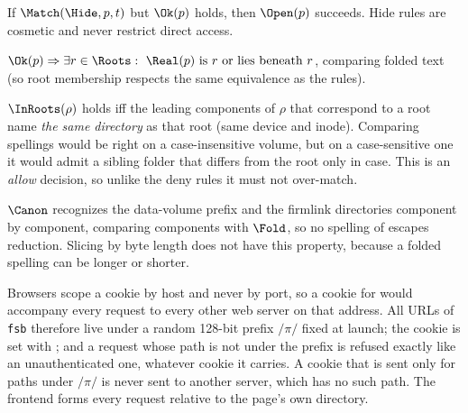 \begin{law}
\label{law:hidden-reachable}
If $\Match(\Hide,p,t)$ but $\Ok(p)$ holds, then $\Open(p)$ succeeds.  Hide rules
are cosmetic and never restrict direct access.
\end{law}

\begin{law}[Containment]
\label{law:containment}
$\Ok(p)\Rightarrow\exists r\in\Roots:\ \Real(p)\text{ is }r\text{ or lies beneath }r$,
comparing folded text (so root membership respects the same equivalence as the
rules).
\end{law}

\begin{law}
\label{law:root-identity}
$\InRoots(\rho)$ holds iff the leading components of $\rho$ that correspond to a
root name \emph{the same directory} as that root (same device and inode).
Comparing spellings would be right on a case-insensitive volume, but on a
case-sensitive one it would admit a sibling folder that differs from the root
only in case.  This is an \emph{allow} decision, so unlike the deny rules it must
not over-match.
\end{law}

\begin{law}
\label{law:alias-fold}
$\Canon$ recognizes the data-volume prefix and the firmlink directories
component by component, comparing components with $\Fold$, so no spelling of
 escapes reduction.  Slicing by byte length
does not have this property, because a folded spelling can be longer or shorter.
\end{law}

\begin{law}
\label{law:cookie-path}
Browsers scope a cookie by host and never by port, so a cookie for
 would accompany every request to every other web server on that
address.  All URLs of \texttt{fsb} therefore live under a random 128-bit prefix
$/\pi/$ fixed at launch; the cookie is set with ; and a
request whose path is not under the prefix is refused exactly like an
unauthenticated one, whatever cookie it carries.  A cookie that is sent only for
paths under $/\pi/$ is never sent to another server, which has no such path.
The frontend forms every request relative to the page's own directory.
\end{law}

